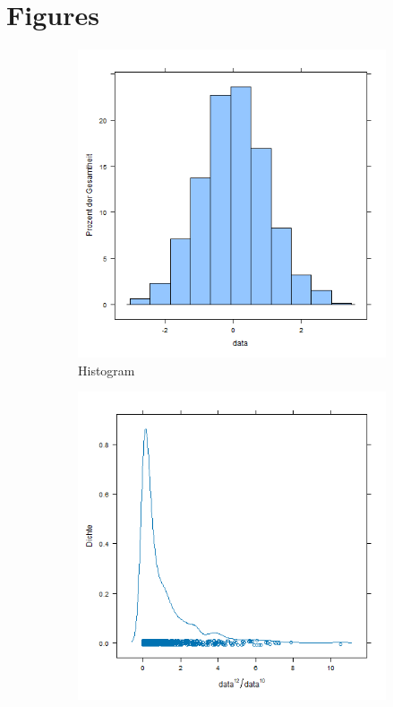\documentclass[12pt]{article}
\begin{document}
\section{Figures}

\begin{figure}[H]
     \centering
     \begin{subfigure}[b]{0.3\textwidth}
         \centering
         \includegraphics[width=\textwidth]{histogram.png}
         \caption{Histogram}
         \label{fig:Hist}
     \end{subfigure}
     \hfill
     \begin{subfigure}[b]{0.3\textwidth}
         \centering
         \includegraphics[width=\textwidth]{density_plot.png}

\end{subfigure}
\end{figure}
\end{document}

